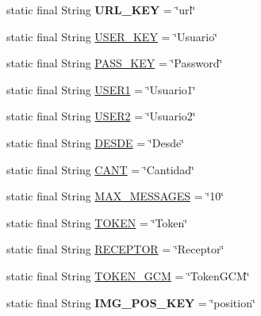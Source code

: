 \begin{DoxyCompactItemize}
\item 
static final String {\bfseries U\+R\+L\+\_\+\+K\+EY} = \char`\"{}url\char`\"{}\hypertarget{classcom_1_1example_1_1sebastian_1_1tindertp_1_1commonTools_1_1Common_a55021db0efa3887ab7fb69950534c8da}{}\label{classcom_1_1example_1_1sebastian_1_1tindertp_1_1commonTools_1_1Common_a55021db0efa3887ab7fb69950534c8da}

\item 
static final String \hyperlink{classcom_1_1example_1_1sebastian_1_1tindertp_1_1commonTools_1_1Common_ab1a1f8a9db6e36312ae326c86361829c}{U\+S\+E\+R\+\_\+\+K\+EY} = \char`\"{}Usuario\char`\"{}
\item 
static final String \hyperlink{classcom_1_1example_1_1sebastian_1_1tindertp_1_1commonTools_1_1Common_adde52a07405e8d140a9f86d733e2e160}{P\+A\+S\+S\+\_\+\+K\+EY} = \char`\"{}Password\char`\"{}
\item 
static final String \hyperlink{classcom_1_1example_1_1sebastian_1_1tindertp_1_1commonTools_1_1Common_a881be9247adeac81160ec711fbf46d6d}{U\+S\+E\+R1} = \char`\"{}Usuario1\char`\"{}
\item 
static final String \hyperlink{classcom_1_1example_1_1sebastian_1_1tindertp_1_1commonTools_1_1Common_a4061156dedbfffc7885219e7068a2e6b}{U\+S\+E\+R2} = \char`\"{}Usuario2\char`\"{}
\item 
static final String \hyperlink{classcom_1_1example_1_1sebastian_1_1tindertp_1_1commonTools_1_1Common_adaea9c1bfcff07777a2434f19ea035f5}{D\+E\+S\+DE} = \char`\"{}Desde\char`\"{}
\item 
static final String \hyperlink{classcom_1_1example_1_1sebastian_1_1tindertp_1_1commonTools_1_1Common_a722cf675c0b955610c1909182d9cde13}{C\+A\+NT} = \char`\"{}Cantidad\char`\"{}
\item 
static final String \hyperlink{classcom_1_1example_1_1sebastian_1_1tindertp_1_1commonTools_1_1Common_af961b08c8185ef3e31468a6b75a51c19}{M\+A\+X\+\_\+\+M\+E\+S\+S\+A\+G\+ES} = \char`\"{}10\char`\"{}
\item 
static final String \hyperlink{classcom_1_1example_1_1sebastian_1_1tindertp_1_1commonTools_1_1Common_a31c7a5b9ed601b9b2a006d786e7d882c}{T\+O\+K\+EN} = \char`\"{}Token\char`\"{}
\item 
static final String \hyperlink{classcom_1_1example_1_1sebastian_1_1tindertp_1_1commonTools_1_1Common_a8d6a9a740fdcbcb44b21209728cdf6c8}{R\+E\+C\+E\+P\+T\+OR} = \char`\"{}Receptor\char`\"{}
\item 
static final String \hyperlink{classcom_1_1example_1_1sebastian_1_1tindertp_1_1commonTools_1_1Common_ae728ecac466e96a18cd4d77b5027386d}{T\+O\+K\+E\+N\+\_\+\+G\+CM} = \char`\"{}Token\+G\+CM\char`\"{}
\item 
static final String {\bfseries I\+M\+G\+\_\+\+P\+O\+S\+\_\+\+K\+EY} = \char`\"{}position\char`\"{}\hypertarget{classcom_1_1example_1_1sebastian_1_1tindertp_1_1commonTools_1_1Common_a855b10d332fa64ff2a3b593fa280002f}{}\label{classcom_1_1example_1_1sebastian_1_1tindertp_1_1commonTools_1_1Common_a855b10d332fa64ff2a3b593fa280002f}


\end{DoxyCompactItemize}
